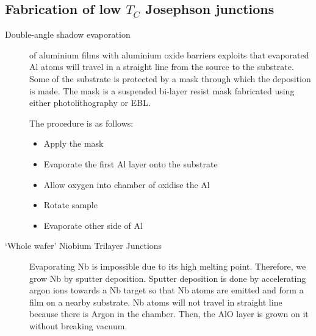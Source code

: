 \subsection{Fabrication of low $T_C$ Josephson junctions}
\begin{description}
\item[Double-angle shadow evaporation] of aluminium films with aluminium oxide barriers exploits that evaporated Al atoms will travel in a straight line from the source to the substrate. Some of the substrate is protected by a mask through which the deposition is made. The mask is a suspended bi-layer resist mask fabricated using either photolithography or EBL. 

The procedure is as follows:
\begin{itemize}
\item Apply the mask
\item Evaporate the first Al layer onto the substrate
\item Allow oxygen into chamber of oxidise the Al
\item Rotate sample
\item Evaporate other side of Al
\end{itemize}


\item[`Whole wafer' Niobium Trilayer Junctions] Evaporating Nb is impossible due to its high melting point. Therefore, we grow Nb by sputter deposition. Sputter deposition is done by accelerating argon ions towards a Nb target so that Nb atoms are emitted and form a film on a nearby substrate. Nb atoms will not travel in straight line because there is Argon in the chamber. Then, the AlO layer is grown on it without breaking vacuum. 


\end{description}



